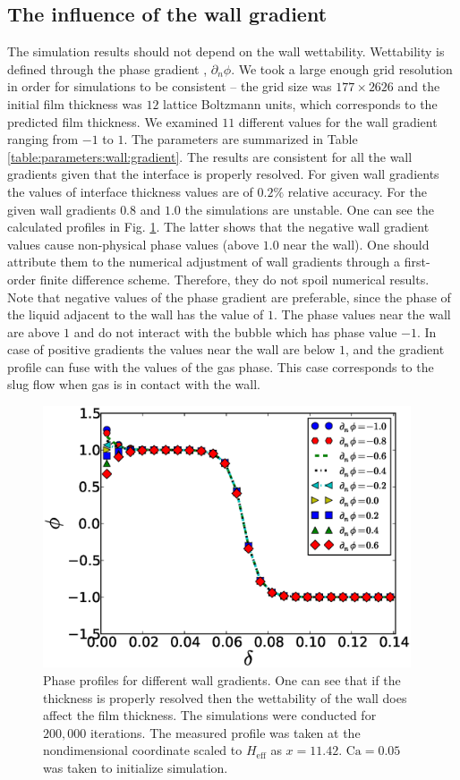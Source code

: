 \documentclass[preprint,12pt]{elsarticle}
\newcommand{\Ca}{\mathrm{Ca}}
\begin{document}
\subsection{The influence of the wall gradient}
The simulation results should not depend on the wall wettability. Wettability is defined
through the phase gradient \cite{pooley-contact}, $\partial_n \phi$.  We took a large
enough grid resolution in order for simulations to be consistent -- the grid size was
$177 \times 2626$ and the initial film thickness was
$12$ lattice Boltzmann units, which corresponds to the predicted film thickness.
We examined $11$ different values for the wall
gradient ranging from $-1$ to $1$. The parameters are summarized in Table
\ref{table:parameters:wall:gradient}. The results are consistent for all the
wall gradients given that the interface is properly resolved. For 
given wall gradients the values of interface thickness values are of $0.2\%$ relative accuracy.  For
the given wall gradients $0.8$
and $1.0$ the
simulations are unstable. One can see the calculated profiles in Fig.
\ref{fig:gradients:profiles}. The latter shows that the negative wall gradient values cause 
non-physical phase values (above $1.0$ near the wall). One should attribute them to the numerical
adjustment of wall gradients through a first-order finite difference scheme. Therefore, they do
not spoil numerical results. Note that
negative values of the phase gradient are
preferable, since the phase of the liquid adjacent to the wall has the value of $1$.
The phase values near the wall are above $1$ and do not interact
with the bubble which has phase value $-1$.  In case of positive
gradients the values near the wall are below $1$, and the gradient profile can
fuse with the values of the gas phase. This case corresponds to the slug flow when gas is in
contact with the wall.
\begin{figure}
\includegraphics[width=0.97\textwidth]{Figures/Wall/phase_grad_profiles.eps}
\caption{Phase profiles for different wall gradients. One can see that if the thickness
is properly resolved then the wettability of the wall does affect the film thickness. The
simulations were conducted for $200,000$ iterations. The measured profile was taken at the
nondimensional coordinate scaled to $H_{\mathrm{eff}}$ as $x=11.42$. $\Ca=0.05$ was taken to
initialize simulation.
\label{fig:gradients:profiles}
}
\end{figure}
\end{document}
